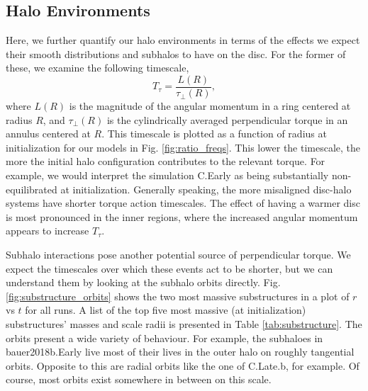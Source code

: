 \subsection{Halo Environments} \label{ssec:halo_env}


Here, we further quantify our halo environments in terms of the effects we expect their smooth distributions and subhalos to have on the disc. For the former of these, we examine the following timescale,
\begin{equation}
T_\tau = \frac{L(R)}{\tau_\perp(R)},
\end{equation}
where $L(R)$ is the magnitude of the angular momentum in a ring centered at radius $R$, and $\tau_\perp(R)$ is the cylindrically averaged perpendicular torque in an annulus centered at $R$. This timescale is plotted as a function of radius at initialization for our models in Fig. \ref{fig:ratio_freqs}. This lower the timescale, the more the initial halo configuration contributes to the relevant torque. For example, we would interpret the simulation C.Early as being substantially non-equilibrated at initialization. Generally speaking, the more misaligned disc-halo systems have shorter torque action timescales. The effect of having a warmer disc is most pronounced in the inner regions, where the increased angular momentum appears to increase $T_\tau$.


 
Subhalo interactions pose another potential source of perpendicular torque. We expect the timescales over which these events act to be shorter, but we can understand them by looking at the subhalo orbits directly. Fig. \ref{fig:substructure_orbits} shows the two most massive substructures in a plot of $r$ vs $t$ for all runs. A list of the top five most massive (at initialization) substructures' masses and scale radii is presented in Table \ref{tab:substructure}. The orbits present a wide variety of behaviour. For example, the subhaloes in bauer2018b.Early live most of their lives in the outer halo on roughly tangential orbits. Opposite to this are radial orbits like the one of C.Late.b, for example. Of course, most orbits exist somewhere in between on this scale. 




